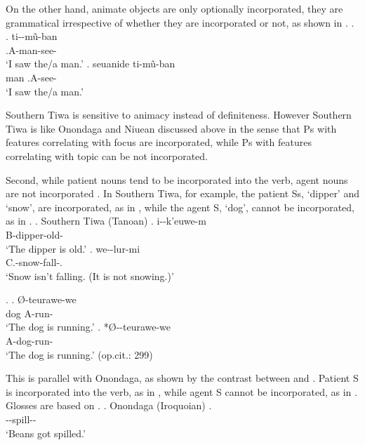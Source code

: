On the other hand,
animate objects are only optionally incorporated,
they are grammatical irrespective of whether they are incorporated or not,
as shown in \Next[a-b].
%
\ex.
 \ag. ti--m\~{u}-ban \\
      .{\sc A}-man-see- \\
      `I saw the/a man.'
 \bg. seuanide ti-m\~{u}-ban \\
      man .{\sc A}-see- \\
      `I saw the/a man.'
      \hfill{\cite[294-295]{allenetal84}}

Southern Tiwa is sensitive to animacy instead of definiteness.
However Southern Tiwa is like Onondaga and Niuean discussed above
in the sense that
Ps with features correlating with focus are incorporated,
while Ps with features correlating with topic can be not incorporated.


Second,
while patient nouns tend to be incorporated into the verb,
agent nouns are not incorporated \cite{mithun84,baker88}.
In Southern Tiwa, for example,
the patient Ss, `dipper' and `snow', are incorporated, as in \Next,
while the agent S, `dog', cannot be incorporated, as in \NNext.
\ex. Southern Tiwa (Tanoan)
 \ag. {i--k'euwe-m} \\
	{\sc B}-{dipper}-old- \\
	`The dipper is old.'
 \bg. {we--lur-mi} \\
	{\sc C}.-{snow}-fall-. \\
	`Snow isn't falling. (It is not snowing.)' \hfill{\cite[300]{allenetal84}}
	
\ex.
 \ag. {} {{\O}-teurawe-we} \\
	{dog} {\sc A}-run- \\
	`The dog is running.'
 \bg. *{{\O}--teurawe-we} \\
	{\sc A}-{dog}-run- \\
	`The dog is running.' \hfill{(op.cit.: 299)}

This is parallel with Onondaga, as shown by the contrast between \Next and \NNext.
Patient S is incorporated into the verb, as in \Next,
while agent S cannot be incorporated, as in \Next[b].
Glosses are based on .
%
\ex. Onondaga (Iroquoian)
 \ag.  \\
	--spill-- \\
	`Beans got spilled.'
	\hfill{\cite[15]{woodbury75}}

